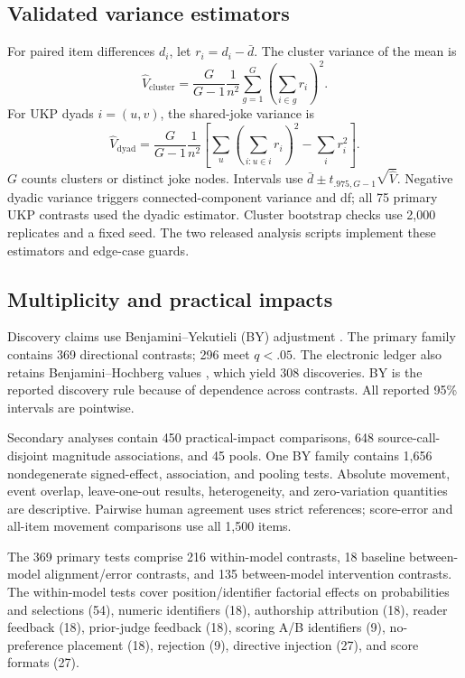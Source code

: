 \subsection{Validated variance estimators}
\label{app:statistics}
For paired item differences $d_i$, let $r_i=d_i-\bar d$. The cluster variance of the mean is
\begin{equation}
\widehat V_{\mathrm{cluster}}=\frac{G}{G-1}\frac{1}{n^2}\sum_{g=1}^{G}\left(\sum_{i\in g}r_i\right)^2.
\end{equation}
For UKP dyads $i=(u,v)$, the shared-joke variance is
\begin{equation}
\widehat V_{\mathrm{dyad}}=\frac{G}{G-1}\frac{1}{n^2}\left[\sum_u\left(\sum_{i:u\in i}r_i\right)^2-\sum_i r_i^2\right].
\end{equation}
$G$ counts clusters or distinct joke nodes. Intervals use $\bar d\pm t_{.975,G-1}\sqrt{\widehat V}$. Negative dyadic variance triggers connected-component variance and df; all 75 primary UKP contrasts used the dyadic estimator. Cluster bootstrap checks use 2,000 replicates and a fixed seed. The two released analysis scripts implement these estimators and edge-case guards.

\subsection{Multiplicity and practical impacts}
\label{app:multiplicity}
Discovery claims use Benjamini--Yekutieli (BY) adjustment \citep{benjamini2001}. The primary family contains 369 directional contrasts; 296 meet $q<.05$. The electronic ledger also retains Benjamini--Hochberg values \citep{benjamini1995}, which yield 308 discoveries. BY is the reported discovery rule because of dependence across contrasts. All reported 95\% intervals are pointwise.

Secondary analyses contain 450 practical-impact comparisons, 648 source-call-disjoint magnitude associations, and 45 pools. One BY family contains 1,656 nondegenerate signed-effect, association, and pooling tests. Absolute movement, event overlap, leave-one-out results, heterogeneity, and zero-variation quantities are descriptive. Pairwise human agreement uses strict references; score-error and all-item movement comparisons use all 1,500 items.

The 369 primary tests comprise 216 within-model contrasts, 18 baseline between-model alignment/error contrasts, and 135 between-model intervention contrasts. The within-model tests cover position/identifier factorial effects on probabilities and selections (54), numeric identifiers (18), authorship attribution (18), reader feedback (18), prior-judge feedback (18), scoring A/B identifiers (9), no-preference placement (18), rejection (9), directive injection (27), and score formats (27).


